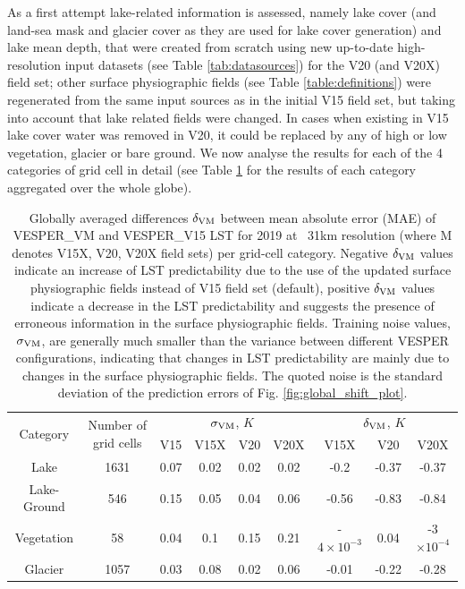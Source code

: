 \documentclass[hess, twostagejnl]{copernicus}
\begin{document}
As a first attempt lake-related information is assessed, namely lake cover (and land-sea mask and glacier cover as they are used for lake cover generation) and lake mean depth, that were created from scratch using new up-to-date high-resolution input datasets (see Table \ref{tab:datasources}) for the V20 (and V20X) field set; other surface physiographic fields (see Table \ref{table:definitions}) were regenerated from the same input sources as in the initial V15 field set, but taking into account that lake related fields were changed. In cases when existing in V15 lake cover water was removed in V20, it could be replaced by any of high or low vegetation, glacier or bare ground. We now analyse the results for each of the 4 categories of grid cell in detail (see Table \ref{tab:categorisation} for the results of each category aggregated over the whole globe).
\begin{table}
	\begin{tabular}{ccccccccc}
		\toprule
		\multirow{2}{*}{Category} & \multirow{2}{*}{Number of grid cells} & 	\multicolumn{4}{c}{$\sigma_{\rm VM}$, $K$} &\multicolumn{3}{c}{$\delta_{\rm VM}$, $K$} \\  
		&&V15  & V15X & V20 & V20X & V15X &V20 & V20X  \\
		\hline 
		Lake&1631 & 0.07& 0.02& 0.02& 0.02&  -0.2 & -0.37&-0.37 \\
		Lake-Ground&546 & 0.15 &0.05& 0.04& 0.06 & -0.56 &-0.83& -0.84 \\
		Vegetation&58 & 0.04 &0.1& 0.15& 0.21&  -$4 \times 10^{-3}$&0.04 & -3 $\times 10^{-4}$ \\
		Glacier&1057 & 0.03& 0.08& 0.02& 0.06 & -0.01& -0.22& -0.28  \\
		\bottomrule
	\end{tabular}
	\caption{Globally averaged differences $\delta_{\rm VM}$ between mean absolute error (MAE) of VESPER\_VM  and VESPER\_V15 LST for 2019 at ~31km resolution (where M denotes V15X, V20, V20X field sets) per grid-cell category. Negative $\delta_{\rm VM}$ values indicate an increase of LST predictability due to the use of the updated surface physiographic fields instead of V15 field set (default), positive $\delta_{\rm VM}$ values indicate a decrease in the LST predictability and suggests the presence of erroneous information in the surface physiographic fields. Training noise values, $\sigma_{\rm VM}$, are generally much smaller than the variance between different VESPER configurations, indicating that changes in LST predictability are mainly due to changes in the surface physiographic fields. The quoted noise is the standard deviation of the prediction errors of Fig. \ref{fig:global_shift_plot}.}
	\label{tab:categorisation}
\end{table}	
\end{document}
